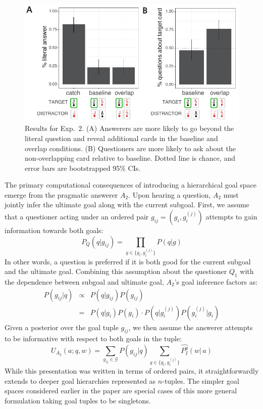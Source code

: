 \documentclass[11pt, floatsintext]{apa6}
\begin{document}
\begin{figure}[th!]
\begin{center}
\includegraphics[scale = 1]{Exp2/qualitativeResults.pdf}
\end{center}
\caption{Results for Exp.~2. (A) Answerers are more likely to go beyond the literal question and reveal additional cards in the baseline and overlap conditions. (B) Questioners are more likely to ask about the non-overlapping card relative to baseline. Dotted line is chance, and error bars are bootstrapped 95\% CIs.}
\label{fig:exp2results}
\end{figure}

The primary computational consequences of introducing a hierarchical goal space emerge from the pragmatic answerer $A_2$. 
Upon hearing a question, $A_2$ must jointly infer the ultimate goal along with the current subgoal.
First, we assume that a questioner acting under an ordered pair $g_{ij} = (g_i, g_i^{(j)})$ attempts to gain information towards both goals:
$$P_{Q}(q | g_{ij}) = \prod_{g\in \{g_i, g_i^{(j)}\}} P(q | g)$$
In other words, a question is preferred if it is both good for the current subgoal and the ultimate goal.
Combining this assumption about the questioner $Q_1$ with the dependence between subgoal and ultimate goal, $A_2$'s goal inference factors as:
$$\begin{array}{rcl}
P(g_{ij} | q) & \propto & P(q | g_{ij})P(g_{ij}) \\
 & = & P(q | g_i)P(g_i) \cdot P(q | g_i^{(j)}) P(g_i^{(j)} | g_i)
 \end{array}$$
Given a posterior over the goal tuple $g_{ij}$, we then assume the answerer attempts to be informative with respect to both goals in the tuple: 
$$U_{A_2}(a; q, w) = \sum_{g_{ij} \in \mathcal{G}} P(g_{ij}|q) \sum_{g\in \{g_i, g_i^{(j)}\}}\widehat{P^g_I}(w|\,a)$$
While this presentation was written in terms of ordered pairs, it straightforwardly extends to deeper goal hierarchies represented as $n$-tuples. 
The simpler goal spaces considered earlier in the paper are special cases of this more general formulation taking goal tuples to be singletons.
\end{document}
